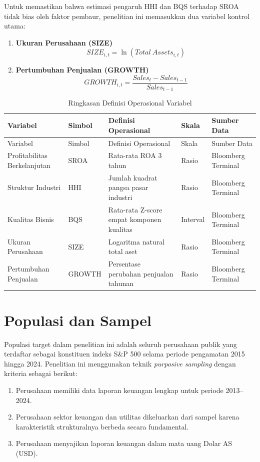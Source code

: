 \documentclass[12pt,a4paper]{report}
\begin{document}
Untuk memastikan bahwa estimasi pengaruh HHI dan BQS terhadap SROA tidak bias oleh faktor pembaur, penelitian ini memasukkan dua variabel kontrol utama:

\begin{enumerate}
    \item \textbf{Ukuran Perusahaan (SIZE)}
    \[
    SIZE_{i,t} = \ln(Total\ Assets_{i,t})
    \]
    \item \textbf{Pertumbuhan Penjualan (GROWTH)}
    \[
    GROWTH_{i,t} = \frac{Sales_t - Sales_{t-1}}{Sales_{t-1}}
    \]
\end{enumerate}

\begin{longtable}{lllll}
\caption{Ringkasan Definisi Operasional Variabel}\\
\toprule
Variabel & Simbol & Definisi Operasional & Skala & Sumber Data \\
\midrule
\endfirsthead
\toprule
Variabel & Simbol & Definisi Operasional & Skala & Sumber Data \\
\midrule
\endhead
Profitabilitas Berkelanjutan & SROA & Rata-rata ROA 3 tahun & Rasio & Bloomberg Terminal \\
Struktur Industri & HHI & Jumlah kuadrat pangsa pasar industri & Rasio & Bloomberg Terminal \\
Kualitas Bisnis & BQS & Rata-rata Z-score empat komponen kualitas & Interval & Bloomberg Terminal \\
Ukuran Perusahaan & SIZE & Logaritma natural total aset & Rasio & Bloomberg Terminal \\
Pertumbuhan Penjualan & GROWTH & Persentase perubahan penjualan tahunan & Rasio & Bloomberg Terminal \\
\bottomrule
\end{longtable}

\section{Populasi dan Sampel}

Populasi target dalam penelitian ini adalah seluruh perusahaan publik yang terdaftar sebagai konstituen indeks S\&P 500 selama periode pengamatan 2015 hingga 2024. Penelitian ini menggunakan teknik \textit{purposive sampling} dengan kriteria sebagai berikut:

\begin{enumerate}
    \item Perusahaan memiliki data laporan keuangan lengkap untuk periode 2013--2024.
    \item Perusahaan sektor keuangan dan utilitas dikeluarkan dari sampel karena karakteristik strukturalnya berbeda secara fundamental.
    \item Perusahaan menyajikan laporan keuangan dalam mata uang Dolar AS (USD).
\end{enumerate}
\end{document}
